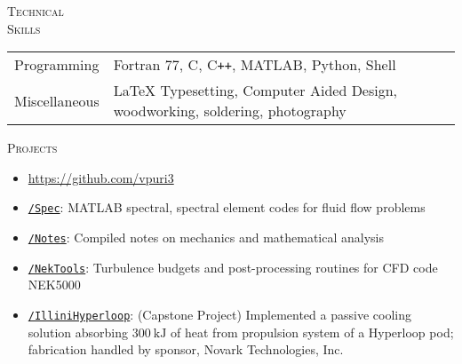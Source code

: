\documentclass[10pt]{article}
\begin{document}
\vspace{-1.5em}
\begin{multicols}{2}
\textsc{\small Technical \\ Skills}
\columnbreak

\begin {table}[H]
\begin{tabular}{l l }
\hspace{-0.5em}Programming   & \hspace{-0.0em} Fortran 77, C, C\texttt{++}, MATLAB, Python, Shell\\
\hspace{-0.5em}Miscellaneous & \hspace{-0.0em} \LaTeX{} Typesetting, Computer Aided Design, woodworking, soldering, photography \\
\end{tabular}	
\end{table}

\vspace{-1.0em}
\end{multicols}
\vspace{-1.5em}
\begin{multicols}{2}
\textsc{\small Projects}
\columnbreak

\vspace{-1.75em}
\begin{itemize}[label=-]
    \setlength{\itemindent}{-1.75em}
    \setlength\itemsep{-0.25em}
    \item[]\hspace{-1.0em} \url{https://github.com/vpuri3}
    \item \href{https://github.com/vpuri3/Spec}{\texttt{/Spec}}: MATLAB spectral, spectral element codes for fluid flow problems
    \item \href{https://github.com/vpuri3/Notes}{\texttt{/Notes}}: Compiled notes on mechanics and mathematical analysis
    \item \href{https://github.com/vpuri3/NekTools}{\texttt{/NekTools}}: Turbulence budgets and post-processing routines for CFD code NEK5000
    \item \href{https://github.com/vpuri3/IlliniHyperloop}{\texttt{/IlliniHyperloop}}: (Capstone Project) Implemented a passive cooling solution absorbing $\SI{300}{\kilo \joule}$ of heat from propulsion system of a Hyperloop pod; fabrication handled by sponsor, Novark Technologies, Inc.
\end{itemize}
\vspace{-2.0em}

\end{multicols}
\vspace{-1.5em}
\vfill
\end{document}
